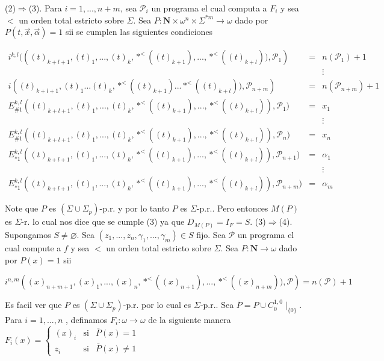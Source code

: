 \PROOF (2)\(\Rightarrow \)(3). Para \(i=1,...,n+m\), sea \(\mathcal{P}_{i}\) un programa el cual computa a \(F_{i}\) y sea \(< \) un orden total estricto sobre \(\Sigma \). Sea \(P:\mathbf{N}\times \omega ^{n}\times \Sigma ^{\ast m}\rightarrow \omega \) dado por \(P(t,\vec{x},\vec{\alpha})=1\) sii se cumplen las siguientes condiciones

\(\displaystyle \begin{array}{rcl} i^{k,l}(\left( (t)_{k+l+1},(t)_{1},...,(t)_{k},\ast ^{< }((t)_{k+1}),...,\ast ^{< }((t)_{k+l})),\mathcal{P}_{1}\right) & =& n(\mathcal{P}_{1})+1 \\ & & \vdots \\ i\left( (t)_{k+l+1},(t)_{1}...(t)_{k},\ast ^{< }((t)_{k+1})...\ast ^{< }((t)_{k+l})),\mathcal{P}_{n+m}\right) & =& n(\mathcal{P}_{n+m})+1 \\ E_{\#1}^{k,l}((t)_{k+l+1},(t)_{1},...,(t)_{k},\ast ^{< }((t)_{k+1}),...,\ast ^{< }((t)_{k+l})),\mathcal{P}_{1}) & =& x_{1} \\ & & \vdots \\ E_{\#1}^{k,l}((t)_{k+l+1},(t)_{1},...,(t)_{k},\ast ^{< }((t)_{k+1}),...,\ast ^{< }((t)_{k+l})),\mathcal{P}_{n}) & =& x_{n} \\ E_{\ast 1}^{k,l}((t)_{k+l+1},(t)_{1},...,(t)_{k},\ast ^{< }((t)_{k+1}),...,\ast ^{< }((t)_{k+l})),\mathcal{P}_{n+1}) & =& \alpha _{1} \\ & & \vdots \\ E_{\ast 1}^{k,l}((t)_{k+l+1},(t)_{1},...,(t)_{k},\ast ^{< }((t)_{k+1}),...,\ast ^{< }((t)_{k+l})),\mathcal{P}_{n+m}) & =& \alpha _{m} \end{array} \)

Note que \(P\) es \((\Sigma \cup \Sigma _{p})\)-p.r. y por lo tanto \(P\) es \( \Sigma \)-p.r.. Pero entonces \(M(P)\) es \(\Sigma \)-r. lo cual nos dice que se cumple (3) ya que \(D_{M(P)}=I_{F}=S\).
(3)\(\Rightarrow \)(4). Supongamos \(S\neq \varnothing \). Sea \( (z_{1},...,z_{n},\gamma _{1},...,\gamma _{m})\in S\) fijo. Sea \(\mathcal{P}\) un programa el cual compute a \(f\) y sea \(< \) un orden total estricto sobre \( \Sigma \). Sea \(P:\mathbf{N}\rightarrow \omega \) dado por \(P(x)=1\) sii

\(\displaystyle i^{n,m}\left( (x)_{n+m+1},(x)_{1},...,(x)_{n},\ast ^{< }((x)_{n+1}),...,\ast ^{< }((x)_{n+m})),\mathcal{P}\right) =n(\mathcal{P})+1 \)

Es facil ver que \(P\) es \((\Sigma \cup \Sigma _{p})\)-p.r. por lo cual es \( \Sigma \)-p.r.. Sea \(\bar{P}=P\cup C_{0}^{1,0}\mid _{\{0\}}\). Para \(i=1,...,n\) , definamos \(F_{i}:\omega \rightarrow \omega \) de la siguiente manera
\(\displaystyle F_{i}(x)=\left\{ \begin{array}{ccc} (x)_{i} & \text{si} & \bar{P}(x)=1 \\ z_{i} & \text{si} & \bar{P}(x)\neq 1 \end{array} \right. \)


